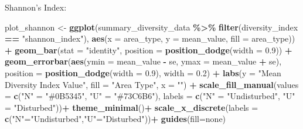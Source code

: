 \documentclass[
]{article}
\newenvironment{Shaded}{\begin{snugshade}}{\end{snugshade}}
\newcommand{\AttributeTok}[1]{\textcolor[rgb]{0.13,0.29,0.53}{#1}}
\newcommand{\FloatTok}[1]{\textcolor[rgb]{0.00,0.00,0.81}{#1}}
\newcommand{\FunctionTok}[1]{\textcolor[rgb]{0.13,0.29,0.53}{\textbf{#1}}}
\newcommand{\NormalTok}[1]{#1}
\newcommand{\OtherTok}[1]{\textcolor[rgb]{0.56,0.35,0.01}{#1}}
\newcommand{\SpecialCharTok}[1]{\textcolor[rgb]{0.81,0.36,0.00}{\textbf{#1}}}
\newcommand{\StringTok}[1]{\textcolor[rgb]{0.31,0.60,0.02}{#1}}
\begin{document}
Shannon's Index:

\begin{Shaded}
\begin{Highlighting}[]
\NormalTok{  plot\_shannon }\OtherTok{\textless{}{-}} \FunctionTok{ggplot}\NormalTok{(summary\_diversity\_data }\SpecialCharTok{\%\textgreater{}\%} \FunctionTok{filter}\NormalTok{(diversity\_index }\SpecialCharTok{==} \StringTok{"shannon\_index"}\NormalTok{), }
                         \FunctionTok{aes}\NormalTok{(}\AttributeTok{x =}\NormalTok{ area\_type, }\AttributeTok{y =}\NormalTok{ mean\_value, }\AttributeTok{fill =}\NormalTok{ area\_type)) }\SpecialCharTok{+}
    \FunctionTok{geom\_bar}\NormalTok{(}\AttributeTok{stat =} \StringTok{"identity"}\NormalTok{, }\AttributeTok{position =} \FunctionTok{position\_dodge}\NormalTok{(}\AttributeTok{width =} \FloatTok{0.9}\NormalTok{)) }\SpecialCharTok{+}
    \FunctionTok{geom\_errorbar}\NormalTok{(}\FunctionTok{aes}\NormalTok{(}\AttributeTok{ymin =}\NormalTok{ mean\_value }\SpecialCharTok{{-}}\NormalTok{ se, }\AttributeTok{ymax =}\NormalTok{ mean\_value }\SpecialCharTok{+}\NormalTok{ se), }
                  \AttributeTok{position =} \FunctionTok{position\_dodge}\NormalTok{(}\AttributeTok{width =} \FloatTok{0.9}\NormalTok{), }
                  \AttributeTok{width =} \FloatTok{0.2}\NormalTok{) }\SpecialCharTok{+}
    \FunctionTok{labs}\NormalTok{(}\AttributeTok{y =} \StringTok{"Mean Diversity Index Value"}\NormalTok{, }\AttributeTok{fill =} \StringTok{"Area Type"}\NormalTok{, }\AttributeTok{x =} \StringTok{""}\NormalTok{) }\SpecialCharTok{+}
    \FunctionTok{scale\_fill\_manual}\NormalTok{(}\AttributeTok{values =} \FunctionTok{c}\NormalTok{(}\StringTok{"N"} \OtherTok{=} \StringTok{"\#0B5345"}\NormalTok{, }\StringTok{"U"} \OtherTok{=} \StringTok{"\#73C6B6"}\NormalTok{), }\AttributeTok{labels =} \FunctionTok{c}\NormalTok{(}\StringTok{"N"} \OtherTok{=} \StringTok{"Undisturbed"}\NormalTok{, }\StringTok{"U"} \OtherTok{=} \StringTok{"Disturbed"}\NormalTok{))}\SpecialCharTok{+}
    \FunctionTok{theme\_minimal}\NormalTok{()}\SpecialCharTok{+}
    \FunctionTok{scale\_x\_discrete}\NormalTok{(}\AttributeTok{labels =} \FunctionTok{c}\NormalTok{(}\StringTok{"N"}\OtherTok{=}\StringTok{"Undisturbed"}\NormalTok{,}\StringTok{"U"}\OtherTok{=}\StringTok{"Disturbed"}\NormalTok{))}\SpecialCharTok{+}
    \FunctionTok{guides}\NormalTok{(}\AttributeTok{fill=}\StringTok{\textquotesingle{}none\textquotesingle{}}\NormalTok{)}
\end{Highlighting}
\end{Shaded}
\end{document}
